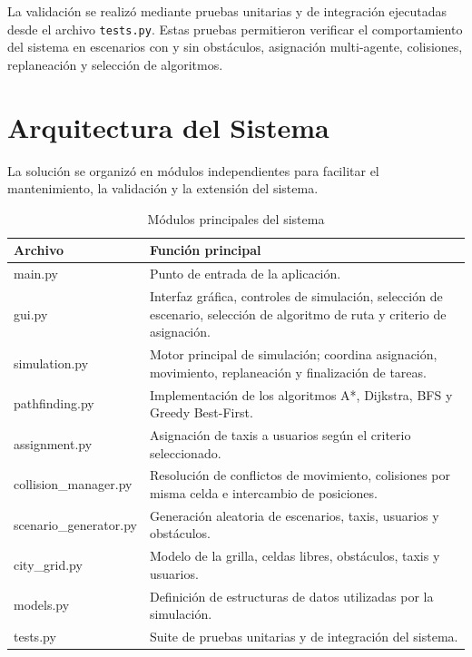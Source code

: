 \documentclass[12pt,a4paper]{article}
\begin{document}
La validación se realizó mediante pruebas unitarias y de integración ejecutadas desde el archivo \texttt{tests.py}. Estas pruebas permitieron verificar el comportamiento del sistema en escenarios con y sin obstáculos, asignación multi-agente, colisiones, replaneación y selección de algoritmos.

\section{Arquitectura del Sistema}
\justifying

La solución se organizó en módulos independientes para facilitar el mantenimiento, la validación y la extensión del sistema.

\begin{table}[H]
\centering
\small
\caption{Módulos principales del sistema}
\begin{tabularx}{\textwidth}{>{\ttfamily}p{4.2cm} X}
\toprule
\textbf{Archivo} & \textbf{Función principal} \\
\midrule
main.py & Punto de entrada de la aplicación. \\
gui.py & Interfaz gráfica, controles de simulación, selección de escenario, selección de algoritmo de ruta y criterio de asignación. \\
simulation.py & Motor principal de simulación; coordina asignación, movimiento, replaneación y finalización de tareas. \\
pathfinding.py & Implementación de los algoritmos A*, Dijkstra, BFS y Greedy Best-First. \\
assignment.py & Asignación de taxis a usuarios según el criterio seleccionado. \\
collision\_manager.py & Resolución de conflictos de movimiento, colisiones por misma celda e intercambio de posiciones. \\
scenario\_generator.py & Generación aleatoria de escenarios, taxis, usuarios y obstáculos. \\
city\_grid.py & Modelo de la grilla, celdas libres, obstáculos, taxis y usuarios. \\
models.py & Definición de estructuras de datos utilizadas por la simulación. \\
tests.py & Suite de pruebas unitarias y de integración del sistema. \\
\bottomrule
\end{tabularx}
\end{table}
\end{document}
